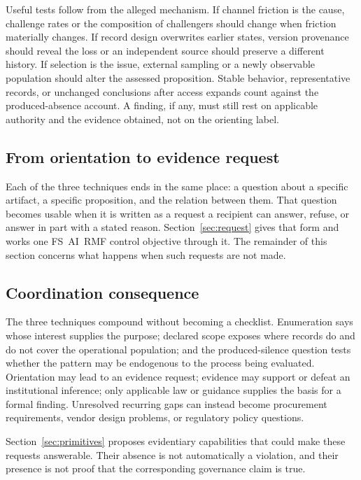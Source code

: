 Useful tests follow from the alleged mechanism. If channel friction is the
cause, challenge rates or the composition of challengers should change when
friction materially changes. If record design overwrites earlier states,
version provenance should reveal the loss or an independent source should
preserve a different history. If selection is the issue, external sampling or a
newly observable population should alter the assessed proposition. Stable
behavior, representative records, or unchanged conclusions after access expands
count against the produced-absence account. A finding, if any, must still rest
on applicable authority and the evidence obtained, not on the orienting label.

\subsection{From orientation to evidence request}
\label{sec:diagnostics:evidence-request}

Each of the three techniques ends in the same place: a question about a
specific artifact, a specific proposition, and the relation between them.
That question becomes usable when it is written as a request a recipient can
answer, refuse, or answer in part with a stated reason.
Section~\ref{sec:request} gives that form and works one FS~AI~RMF control
objective through it. The remainder of this section concerns what happens when
such requests are not made.

\subsection{Coordination consequence}
\label{sec:diagnostics:compounding}

The three techniques compound without becoming a checklist. Enumeration says
whose interest supplies the purpose; declared scope exposes where records do
and do not cover the operational population; and the produced-silence question
tests whether the pattern may be endogenous to the process being evaluated.
Orientation may lead to an evidence request; evidence may support or defeat an
institutional inference; only applicable law or guidance supplies the basis for
a formal finding. Unresolved recurring gaps can instead become procurement
requirements, vendor design problems, or regulatory policy questions.

Section~\ref{sec:primitives} proposes evidentiary capabilities that could make
these requests answerable. Their absence is not automatically a violation, and
their presence is not proof that the corresponding governance claim is true.
